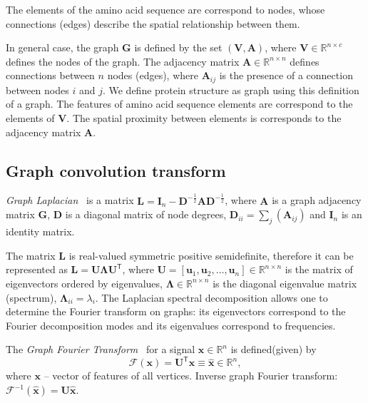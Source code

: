 \documentclass[12pt,twosides]{extarticle}
\begin{document}
The elements of the amino acid sequence are correspond to nodes, whose connections (edges) describe the spatial relationship between them.

In general case, the graph $\mathbf{G}$ is defined by the set $\mathbf{(V, A)}$, where $\mathbf{V}\in \mathbb{R}^{n \times c}$ defines the nodes of the graph. The adjacency matrix $\mathbf{A}\in \mathbb{R}^{n \times n}$ defines connections between $n$ nodes (edges), where $\mathbf{A}_{ij}$ is the presence of a connection between nodes $i$ and $j$. We define protein structure as graph using this definition of a graph. The features of amino acid sequence elements are correspond to the elements of $\mathbf{V}$. The spatial proximity between elements is corresponds to the adjacency matrix $\mathbf{A}$.

\subsection{Graph convolution transform}

\begin{Def}
	\textit{Graph Laplacian}~\cite{Chung:1997} is a matrix $\mathbf{L}=\mathbf{I}_{n}-\mathbf{D}^{-\frac{1}{2}} \mathbf{A} \mathbf{D}^{-\frac{1}{2}}$, where $\mathbf{A}$ is a graph adjacency matrix $\mathbf{G}$,  $\mathbf{D}$ is a diagonal matrix of node degrees, $\mathbf{D}_{i i}=\sum_{j}\left(\mathbf{A}_{i j}\right)$ and $\mathbf{I}_{n}$ is an identity matrix.
\end{Def}

The matrix $\mathbf{L}$ is real-valued symmetric positive semidefinite, therefore it can be represented as $\mathbf{L}=\mathbf{U} \boldsymbol{\Lambda} \mathbf{U}^{\mathsf{T}} $, where $\mathbf{U}=\left[\mathbf{u}_{1}, \mathbf{u}_{2}, \dots, \mathbf{u}_n\right] \in \mathbb{R}^{n \times n}$ is the matrix of eigenvectors ordered by eigenvalues, $\boldsymbol{\Lambda} \in \mathbb{R}^{n \times n}$ is the diagonal eigenvalue matrix (spectrum), $\boldsymbol{\Lambda}_{i i}=\lambda_{i}$. The Laplacian spectral decomposition allows one to determine the Fourier transform on graphs: its eigenvectors correspond to the Fourier decomposition modes and its eigenvalues correspond to frequencies.

\begin{Def}
	The \textit{Graph Fourier Transform}~\cite{journals/spm/ShumanNFOV13} for a signal $\mathbf{x} \in \mathbb{R}^{n}$ is defined(given) by \[\mathscr{F}(\mathbf{x})=\mathbf{U}^{\mathsf{T}} \mathbf{x} \equiv \hat{\mathbf{x}} \in \mathbb{R}^{n},\] where $\mathbf{x}$ -- vector of features of all vertices. Inverse graph Fourier transform: $\mathscr{F}^{-1}(\hat{\mathbf{x}})=\mathbf{U} \hat{\mathbf{x}}$.
\end{Def}
\end{document}
